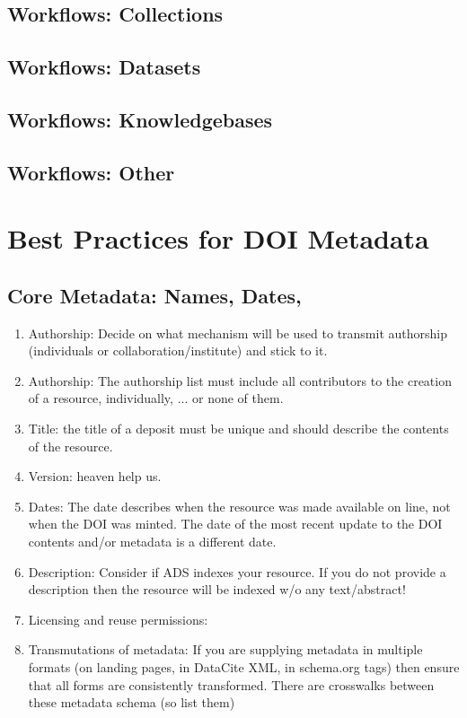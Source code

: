 \documentclass[11pt,a4paper]{ivoa}
\begin{document}
\subsection{Workflows: Collections}
\subsection{Workflows: Datasets}
\subsection{Workflows: Knowledgebases}
\subsection{Workflows: Other}

\section{Best Practices for DOI Metadata}

\subsection{Core Metadata: Names, Dates, }
\begin{enumerate}
\item Authorship: Decide on what mechanism will be used to transmit authorship (individuals or collaboration/institute) and stick to it.
\item Authorship: The authorship list must include all contributors to the creation of a resource, individually, ... or none of them.
\item Title: the title of a deposit must be unique and should describe the contents of the resource.
\item Version: heaven help us.
\item Dates: The date describes when the resource was made available on line, not when the DOI was minted. 
The date of the most recent update to the DOI contents and/or metadata is a different date.
\item Description: Consider if ADS indexes your resource. If you do not provide a description then the resource will be indexed w/o any text/abstract!
\item Licensing and reuse permissions:
\item Transmutations of metadata: 
If you are supplying metadata in multiple formats (on landing pages, in DataCite XML, in schema.org tags)
then ensure that all forms are consistently transformed. 
There are crosswalks between these metadata schema (so list them)
\end{enumerate}
\end{document}
